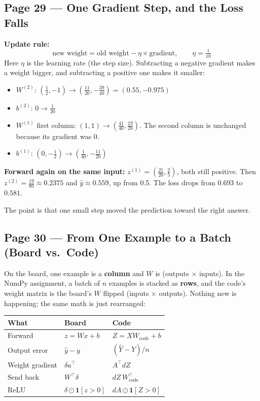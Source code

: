 \subsection*{Page 29 --- One Gradient Step, and the Loss Falls}

\textbf{Update rule:}
\[
\text{new weight} = \text{old weight} - \eta \times \text{gradient}, \qquad \eta = \tfrac{1}{10}
\]
Here $\eta$ is the learning rate (the step size). Subtracting a negative gradient makes a weight bigger, and subtracting a positive one makes it smaller:
\begin{itemize}[leftmargin=*]
  \item $W^{(2)}$: $(\tfrac12, -1) \to (\tfrac{11}{20}, -\tfrac{39}{40}) = (0.55, -0.975)$
  \item $b^{(2)}$: $0 \to \tfrac{1}{20}$
  \item $W^{(1)}$ first column: $(1,1) \to (\tfrac{41}{40}, \tfrac{19}{20})$. The second column is unchanged because its gradient was 0.
  \item $b^{(1)}$: $(0, -\tfrac12) \to (\tfrac{1}{40}, -\tfrac{11}{20})$
\end{itemize}

\textbf{Forward again on the same input:} $z^{(1)} = (\tfrac{21}{20}, \tfrac25)$, both still positive. Then $z^{(2)} = \tfrac{19}{80} \approx 0.2375$ and $\hat{y} \approx 0.559$, up from 0.5. The loss drops from $0.693$ to $0.581$.

The point is that one small step moved the prediction toward the right answer.

\subsection*{Page 30 --- From One Example to a Batch (Board vs.\ Code)}

On the board, one example is a \textbf{column} and $W$ is (outputs $\times$ inputs). In the NumPy assignment, a batch of $n$ examples is stacked as \textbf{rows}, and the code's weight matrix is the board's $W$ flipped (inputs $\times$ outputs). Nothing new is happening; the same math is just rearranged:

\begin{center}
\begin{tabular}{lll}
\toprule
What & Board & Code \\
\midrule
Forward & $z = Wx + b$ & $Z = X W_{\text{code}} + b$ \\
Output error & $\hat{y} - y$ & $(\hat{Y} - Y)/n$ \\
Weight gradient & $\delta a^{\top}$ & $A^{\top} dZ$ \\
Send back & $W^{\top}\delta$ & $dZ\, W_{\text{code}}^{\top}$ \\
ReLU & $\delta \odot \mathbf{1}[z>0]$ & $dA \odot \mathbf{1}[Z>0]$ \\
\bottomrule
\end{tabular}
\end{center}

